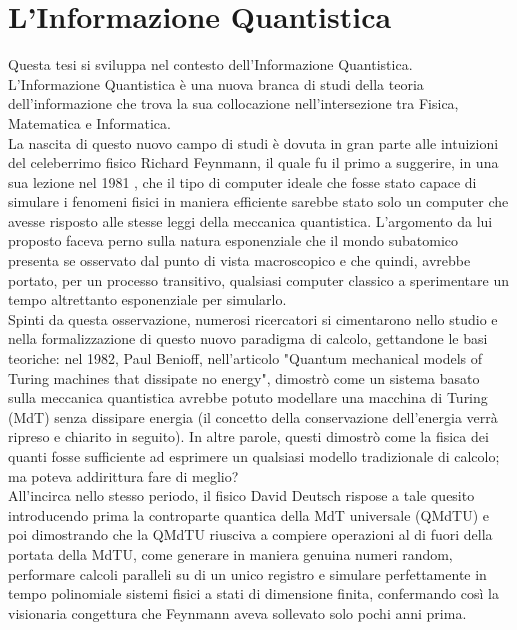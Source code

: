 \documentclass[12pt,a4paper,openright]{report}
\begin{document}
\chapter{L'Informazione Quantistica}
Questa tesi si sviluppa nel contesto dell'Informazione Quantistica.\\
L'Informazione Quantistica è una nuova branca di studi della teoria dell'informazione che trova la sua collocazione nell'intersezione tra
Fisica, Matematica e Informatica.\\
La nascita di questo nuovo campo di studi è dovuta in gran parte alle intuizioni del celeberrimo fisico Richard Feynmann, il quale fu il primo a suggerire,
in una sua lezione nel 1981 \cite{ref6}, che il tipo di computer ideale che fosse stato capace di simulare i fenomeni fisici in maniera
efficiente sarebbe stato solo un computer che avesse risposto alle stesse leggi della meccanica quantistica. L'argomento da lui proposto faceva
perno sulla natura esponenziale che il mondo subatomico presenta se osservato dal punto di vista macroscopico e che quindi, avrebbe portato,
per un processo transitivo, qualsiasi computer classico a sperimentare un tempo altrettanto esponenziale per simularlo.\\
Spinti da questa osservazione, numerosi ricercatori si cimentarono nello studio e nella formalizzazione di questo nuovo paradigma di calcolo,
gettandone le basi teoriche: nel 1982, Paul Benioff, nell'articolo "Quantum mechanical models of Turing machines that dissipate no energy"\cite{ref7}, 
dimostrò come un sistema basato sulla meccanica quantistica avrebbe potuto modellare una macchina di Turing (MdT) senza dissipare energia (il concetto della conservazione dell'energia 
verrà ripreso e chiarito in seguito). In altre parole, questi dimostrò come la fisica dei quanti fosse sufficiente ad esprimere un qualsiasi modello tradizionale di calcolo; ma poteva addirittura fare di meglio? \\
All'incirca nello stesso periodo, il fisico David Deutsch rispose a tale quesito \cite{ref12} introducendo prima la controparte quantica della MdT universale (QMdTU)
e poi dimostrando che la QMdTU riusciva a compiere operazioni al di fuori della portata della MdTU, come generare in maniera genuina numeri random,
performare calcoli paralleli su di un unico registro e simulare perfettamente in tempo polinomiale sistemi fisici a stati di dimensione finita, confermando così
la visionaria congettura che Feynmann aveva sollevato solo pochi anni prima.  
\end{document}
